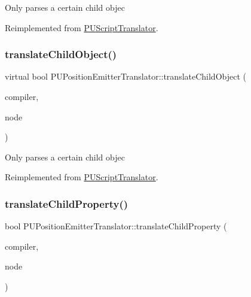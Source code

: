 Only parses a certain child objec 

Reimplemented from \hyperlink{classPUScriptTranslator_ab587d01348ae3e678cb700c719b2b113}{P\+U\+Script\+Translator}.

\mbox{\label{classPUPositionEmitterTranslator_a07a82748049af56c21687a07204988cf}} 
\subsubsection{\texorpdfstring{translate\+Child\+Object()}{translateChildObject()}\hspace{0.1cm}{\footnotesize\ttfamily [2/2]}}
{\footnotesize\ttfamily virtual bool P\+U\+Position\+Emitter\+Translator\+::translate\+Child\+Object (\begin{DoxyParamCaption}\item[{\hyperlink{classPUScriptCompiler}{P\+U\+Script\+Compiler} $\ast$}]{compiler,  }\item[{\hyperlink{classPUAbstractNode}{P\+U\+Abstract\+Node} $\ast$}]{node }\end{DoxyParamCaption})\hspace{0.3cm}{\ttfamily [virtual]}}

Only parses a certain child objec 

Reimplemented from \hyperlink{classPUScriptTranslator_ab587d01348ae3e678cb700c719b2b113}{P\+U\+Script\+Translator}.

\mbox{\label{classPUPositionEmitterTranslator_afe3c5bb3628a9387b52d9813f088e05f}} 
\subsubsection{\texorpdfstring{translate\+Child\+Property()}{translateChildProperty()}\hspace{0.1cm}{\footnotesize\ttfamily [1/2]}}
{\footnotesize\ttfamily bool P\+U\+Position\+Emitter\+Translator\+::translate\+Child\+Property (\begin{DoxyParamCaption}\item[{\hyperlink{classPUScriptCompiler}{P\+U\+Script\+Compiler} $\ast$}]{compiler,  }\item[{\hyperlink{classPUAbstractNode}{P\+U\+Abstract\+Node} $\ast$}]{node }\end{DoxyParamCaption})\hspace{0.3cm}{\ttfamily [virtual]}}

